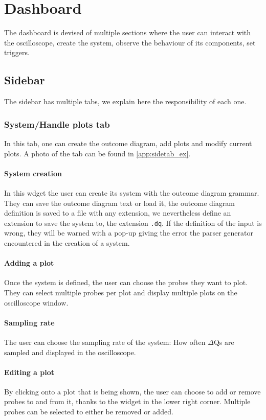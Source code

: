 \section{Dashboard}
    The dashboard is devised of multiple sections where the user can interact with the oscilloscope, create the system, observe the behaviour of its components, set triggers.

    \subsection{Sidebar}
        The sidebar has multiple tabs, we explain here the responsibility of each one.

    \subsubsection{System/Handle plots tab}
        In this tab, one can create the outcome diagram, add plots and modify current plots. A photo of the tab can be found in \cref{app:sidetab_ex}.
    \paragraph{System creation}
        In this wdget the user can create its system with the outcome diagram grammar. They can save the outcome diagram text or load it, the outcome diagram definition is saved to a file with any extension, we nevertheless define an extension to save the system to, the extension \texttt{.dq}.
        If the definition of the input is wrong, they will be warned with a pop-up giving the error the parser generator encountered in the creation of a system.

    \paragraph{Adding a plot}
        Once the system is defined, the user can choose the probes they want to plot. They can select multiple probes per plot and display multiple plots on the oscilloscope window.
    
    \paragraph{Sampling rate}
        The user can choose the sampling rate of the system: How often $\Delta$Qs are sampled and displayed in the oscilloscope.

    \paragraph{Editing a plot}
        By clicking onto a plot that is being shown, the user can choose to add or remove probes to and from it, thanks to the widget in the lower right corner. Multiple probes can be selected to either be removed or added.


